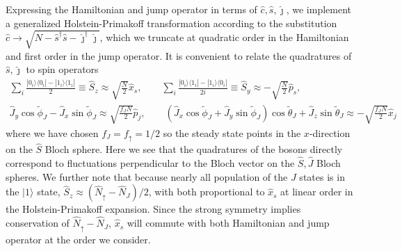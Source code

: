 \documentclass[11pt]{article}
\begin{document}
Expressing the Hamiltonian and jump operator in terms of $\hat c, \hat s, \hat \jmath$, we implement a generalized Holstein-Primakoff transformation according to the substitution $\hat c \to \sqrt{N - \hat{s}^\dagger \hat s - \hat{\jmath}^\dagger \hat \jmath}$, which we truncate at quadratic order in the Hamiltonian and first order in the jump operator. 
It is convenient to relate the quadratures of $\hat s, \hat \jmath$ to spin operators
\begin{subequations}
   \begin{gather}
        \sum_i  \frac{|0_i \rangle \langle 0_i| - |1_i \rangle\langle 1_i|}{2} \equiv
       \hat S_z \approx  \sqrt{\frac{N}{2}} \hat x_s, \qquad
        \sum_i \frac{|0_i \rangle \langle 1_i| - |1_i \rangle \langle 0_i|}{2i} 
       \equiv \hat S_y \approx -\sqrt{\frac{N}{2}} \hat p_s, \\
       \hat J_y \cos \tilde{\phi}_J - \hat J_x \sin \tilde{\phi}_J \approx \sqrt{\frac{f_J N}{2}} \hat p_j, \qquad
       (\hat J_x \cos \tilde{\phi}_J + \hat J_y \sin \tilde{\phi}_J ) \cos \tilde{\theta}_J + \hat J_z \sin \tilde{\theta}_J \approx -\sqrt{\frac{f_J N}{2}} \hat x_j
   \end{gather}
\end{subequations}
where we have chosen $f_J = f_{\uparrow} = 1/2$ so the steady state points in the $x$-direction on the $\hat S$ Bloch sphere. Here we see that the quadratures of the bosons directly correspond to fluctuations perpendicular to the Bloch vector on the $\hat S, \hat J$ Bloch spheres.
We further note that because nearly all population of the $J$ states is in the $|1\rangle$ state, $\hat S_z \approx (\hat N_{\uparrow} - \hat N_J)/2$, with both proportional to $\hat x_s$ at linear order in the Holstein-Primakoff expansion. Since the strong symmetry implies conservation of $\hat N_{\uparrow} - \hat N_{J}$, $\hat x_s$ will commute with both Hamiltonian and jump operator at the order we consider. 
\end{document}
